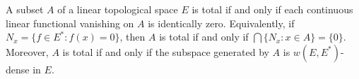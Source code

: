 A subset $A$ of a linear topological space $E$ is total if and only if each continuous linear functional vanishing on $A$ is identically zero. Equivalently, if $N_x = \{f \in E^* : f(x) = 0\}$, then $A$ is total if and only if $\bigcap \{N_x : x \in A\} = \{0\}$. Moreover, $A$ is total if and only if the subspace generated by $A$ is $w(E, E^*)$-dense in $E$.
